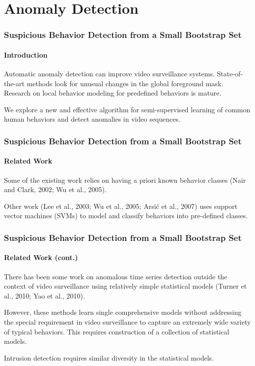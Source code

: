 
\section{Anomaly Detection}

\ifnum{}

\begin{frame}
    \frametitle{Suspicious Behavior Detection from a Small Bootstrap Set}
    \framesubtitle{Introduction}

    Automatic anomaly detection can improve video surveillance systems. 
    State-of-the-art methods look for unusual changes in the global 
    foreground mask. Research on local behavior modeling for predefined 
    behaviors is mature.

    \bigskip 

    We explore a new and effective algorithm for semi-supervised learning 
    of common human behaviors and detect anomalies in video sequences.
  
\end{frame}


\begin{frame}
    \frametitle{Suspicious Behavior Detection from a Small Bootstrap Set}
    \framesubtitle{Related Work}

    Some of the existing work relies on having a priori known behavior
    classes (Nair and Clark, 2002; Wu et al., 2005).

    \bigskip

    Other work (Lee et al., 2003; Wu et al., 2005; Arsi{\'c} et al., 2007)
    uses support vector machines (SVMs) to model and classify behaviors 
    into pre-defined classes.

\end{frame}


\begin{frame}
    \frametitle{Suspicious Behavior Detection from a Small Bootstrap Set}
    \framesubtitle{Related Work (cont.)}

    There has been some work on anomalous time series detection 
    outside the context of video surveillance using relatively 
    simple statistical models (Turner et al., 2010; Yao et al., 2010).

    \bigskip

    However, these methods learn single comprehensive models 
    without addressing the special requirement in video 
    surveillance to capture an extremely wide variety of typical 
    behaviors. This requires construction of a collection of 
    statistical models.

    \bigskip 

    Intrusion detection requires similar diversity in the 
    statistical models.

\end{frame}

